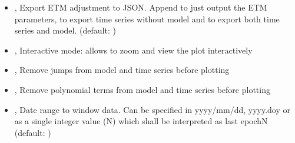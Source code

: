 \documentclass[letterpaper,10pt,english]{sphinxmanual}
\begin{document}
\begin{itemize}
\item {} 
\sphinxAtStartPar
{\hyperref[\detokenize{com:PlotETM.py--json}]{}} , {\hyperref[\detokenize{com:PlotETM.py---json}]{}}  \sphinxhyphen{} Export ETM adjustment to JSON. Append \sphinxcode{\sphinxupquote{\textquotesingle{}0\textquotesingle{}}} to just output the ETM parameters, \sphinxcode{\sphinxupquote{\textquotesingle{}1\textquotesingle{}}} to export time series without model and \sphinxcode{\sphinxupquote{\textquotesingle{}2\textquotesingle{}}} to export both time series and model. (default: )

\item {} 
\sphinxAtStartPar
{\hyperref[\detokenize{com:PlotETM.py--gui}]{}}, {\hyperref[\detokenize{com:PlotETM.py---interactive}]{}} \sphinxhyphen{} Interactive mode: allows to zoom and view the plot interactively

\item {} 
\sphinxAtStartPar
{\hyperref[\detokenize{com:PlotETM.py--rj}]{}}, {\hyperref[\detokenize{com:PlotETM.py---remove_jumps}]{}} \sphinxhyphen{} Remove jumps from model and time series before plotting

\item {} 
\sphinxAtStartPar
{\hyperref[\detokenize{com:PlotETM.py--rp}]{}}, {\hyperref[\detokenize{com:PlotETM.py---remove_polynomial}]{}} \sphinxhyphen{} Remove polynomial terms from model and time series before plotting

\item {} 
\sphinxAtStartPar
{\hyperref[\detokenize{com:PlotETM.py--win}]{}} , {\hyperref[\detokenize{com:PlotETM.py---time_window}]{}}  \sphinxhyphen{} Date range to window data. Can be specified in yyyy/mm/dd, yyyy.doy or as a single integer value (N) which shall be interpreted as last epoch\sphinxhyphen{}N (default: )


\end{itemize}
\end{document}
